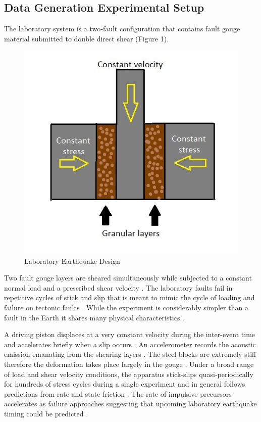 \documentclass[]{llncs} %
\begin{document}
\subsection{Data Generation Experimental Setup}
The laboratory system is a two‐fault configuration that contains fault gouge material submitted to double direct shear (Figure 1)\cite{kaggle}. \par
\begin{figure}[h]
	\centering
	\includegraphics[width=.6\linewidth]{lab}
	\caption{Laboratory Earthquake Design}
	\label{fig:lab}
\end{figure}
Two fault gouge layers are sheared simultaneously while subjected to a constant normal load and a prescribed shear velocity \cite{kaggle}. The laboratory faults fail in repetitive cycles of stick and slip that is meant to mimic the cycle of loading and failure on tectonic faults \cite{kaggle}. While the experiment is considerably simpler than a fault in the Earth it shares many physical characteristics \cite{kaggle}. \par

A driving piston displaces at a very constant velocity during the inter-event time and accelerates briefly when a slip occurs \cite{Bertrand}. An accelerometer records the acoustic emission emanating from the shearing layers \cite{Bertrand}. The steel blocks are extremely stiff therefore the deformation takes place largely in the gouge \cite{Bertrand}. Under a broad range of load and shear velocity conditions, the apparatus stick‐slips quasi‐periodically for hundreds of stress cycles during a single experiment and in general follows predictions from rate and state friction \cite{Bertrand}. The rate of impulsive precursors accelerates as failure approaches suggesting that upcoming laboratory earthquake timing could be predicted \cite{Bertrand}. \par
\end{document}
